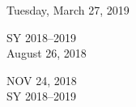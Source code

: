\documentclass[11pt]{article}
\begin{document}
 

Tuesday, March 27, 2019

\vspace*{1in}

\begin{center}
SY 2018--2019\\
August 26, 2018
\end{center} 

NOV 24, 2018 \\

SY 2018--2019\\
\end{document}
